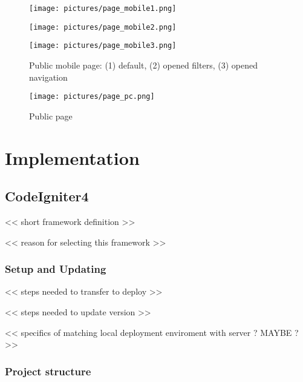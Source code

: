 \documentclass[
  digital,     %
  oneside,     %
  nosansbold,  %
  colorbold, %
  lof,         %
  lot,         %
]{fithesis4}
\begin{document}
\begin{figure}
	\begin{center}
		\begin{minipage}{.3\textwidth}
			\texttt{[image: pictures/page\_mobile1.png]}
		\end{minipage}
		\hfill
		\begin{minipage}{.3\textwidth}
			\texttt{[image: pictures/page\_mobile2.png]}
		\end{minipage}
		\hfill
		\begin{minipage}{.3\textwidth}
			\texttt{[image: pictures/page\_mobile3.png]}
		\end{minipage}
	\end{center}
	\caption{Public mobile page: (1) default, (2) opened filters, (3) opened navigation}
	\label{fig:page-mobile}
\end{figure}

\begin{figure}
	\begin{center}
		\begin{minipage}{.9\textwidth}
			\texttt{[image: pictures/page\_pc.png]}
		\end{minipage}
	\end{center}
	\caption{Public page}
	\label{fig:page-pc}
\end{figure}

\chapter{Implementation}

\section{CodeIgniter4}

<< short framework definition >>

<< reason for selecting this framework >>

\subsection{Setup and Updating}

<< steps needed to transfer to deploy >>

<< steps needed to update version >>

<< specifics of matching local deployment enviroment with server ? MAYBE ?>>

\subsection{Project structure}
\end{document}
